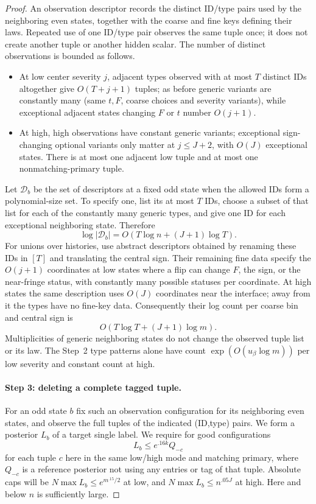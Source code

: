 \begin{proof}
An observation descriptor records the distinct ID/type pairs used by the
neighboring even states, together with the coarse and fine keys defining
their laws. Repeated use of one ID/type pair observes the same tuple once;
it does not create another tuple or another hidden scalar. The number of
distinct observations is bounded as follows.
\begin{itemize}
\item At low center severity \(j\), adjacent types observed with at most \(T\) distinct IDs altogether give \(O(T+j+1)\) tuples; as before generic variants are constantly many (same \(t,F\), coarse choices and severity variants), while exceptional adjacent states changing \(F\) or \(t\) number \(O(j+1)\).
\item At high, high observations have constant generic variants; exceptional sign-changing optional variants only matter at \(j\le J+2\), with \(O(J)\) exceptional states. There is at most one adjacent low tuple and at most one nonmatching-primary tuple.
\end{itemize}
Let \(\mathcal D_b\) be the set of descriptors at a fixed odd state
when the allowed IDs form a polynomial-size set. To specify one, list its
at most \(T\) IDs, choose a subset of that list for each of the constantly
many generic types, and give one ID for each exceptional neighboring
state. Therefore
\[
 \log|\mathcal D_b|=O(T\log n+(J+1)\log T).
\]
For unions over histories, use abstract descriptors obtained by renaming
these IDs in \([T]\) and translating the central sign. Their remaining
fine data specify the \(O(j+1)\) coordinates at low states where a flip
can change \(F\), the sign, or the near-fringe status, with constantly
many possible statuses per coordinate. At high states the same description
uses \(O(J)\) coordinates near the interface; away from it the types
have no fine-key data. Consequently their log count per coarse bin and
central sign is
\[
 O(T\log T+(J+1)\log m).
\]
Multiplicities of generic neighboring states do not change the observed
tuple list or its law. The Step~2 type patterns alone have count
\(\exp(O(u_\beta\log m))\) per low severity and constant count at high.

\paragraph{Step 3: deleting a complete tagged tuple.} For an odd state \(b\) fix such an observation configuration for its neighboring even states, and observe the full tuples of the indicated (ID,type) pairs. We form a posterior \(L_b\) of a target single label. We require for good configurations
\[
 L_b\le e^{.16 k}Q_{-c}
\]
for each tuple \(c\) here in the same low/high mode and matching primary, where \(Q_{-c}\) is a reference posterior not using any entries or tag of that tuple. Absolute caps will be \(N\max L_b\le e^{m^{.15}/2}\) at low, and \(N\max L_b\le n^{.05 J}\) at high. Here and below \(n\) is sufficiently large.


\end{proof}
